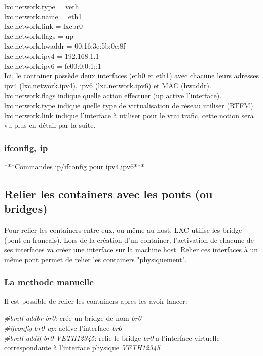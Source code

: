 \documentclass[twoside]{article}
\begin{document}
\noindent
lxc.network.type = veth\\
lxc.network.name = eth1\\
lxc.network.link = lxcbr0\\
lxc.network.flags = up\\
lxc.network.hwaddr = 00:16:3e:5b:0e:8f\\
lxc.network.ipv4 = 192.168.1.1\\
lxc.network.ipv6 = fc00:0:0:1::1\\

Ici, le container poss\`ede deux interfaces (eth0 et eth1) avec chacune leurs adresses ipv4 (lxc.network.ipv4),
ipv6 (lxc.network.ipv6) et MAC (hwaddr).\\
lxc.network.flags indique quelle action effectuer (up active l'interface).\\
lxc.network.type indique quelle type de virtualisation de réseau utiliser (RTFM).\\
lxc.network.link indique l'interface \`a utiliser pour le vrai trafic, cette notion sera vu plus en d\'etail par la suite.\\

\subsubsection{ifconfig, ip}

***Commandes ip/ifconfig pour ipv4,ipv6***

\subsection{Relier les containers avec les ponts (ou bridges)}

Pour relier les containers entre eux, ou m\^eme au host, LXC utilise les bridge (pont en francais). Lors de
la cr\'eation d'un container, l'activation de chacune de ses interfaces va cr\'eer une interface sur la machine
host. Relier ces interfaces \`a un m\^eme pont permet de relier les containers "physiquement".

\subsubsection{La methode manuelle}

Il est possible de relier les containers apres les avoir lancer:

\noindent
\emph{\#brctl addbr br0}: cr\'ee un bridge de nom \emph{br0}\\
\emph{\#ifconfig br0 up}: active l'interface \emph{br0}\\
\emph{\#brctl addif br0 VETH12345}: relie le bridge \emph{br0} a l'interface virtuelle correspondante \`a l'interface physique \emph{VETH12345}\\
\end{document}
